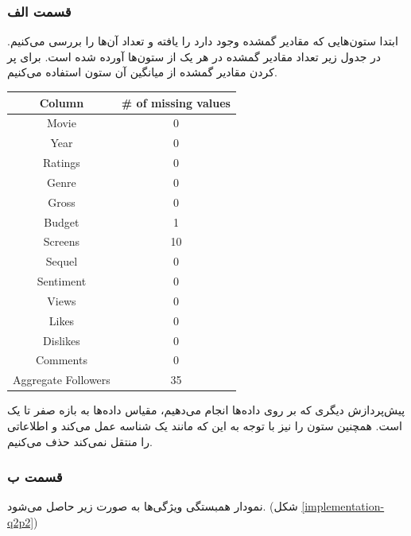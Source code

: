 \documentclass[14pt,a4]{article}
\begin{document}
\subsubsection*{قسمت الف}

ابتدا ستون‌هایی که مقادیر گمشده وجود دارد را یافته و تعداد آن‌ها را بررسی می‌کنیم.
در جدول زیر تعداد مقادیر گمشده در هر یک از ستون‌ها آورده شده است. برای پر کردن مقادیر گمشده از میانگین
آن‌ ستون استفاده می‌کنیم.

\begin{latin}
    \begin{table}
        \centering
        \begin{tabular}{c|c}
            Column               & \# of missing values \\
            \hline
            Movie                &  0 \\
            Year                 &  0 \\
            Ratings              &  0 \\
            Genre                &  0 \\
            Gross                &  0 \\
            Budget               &  1 \\
            Screens              & 10 \\
            Sequel               &  0 \\
            Sentiment            &  0 \\
            Views                &  0 \\
            Likes                &  0 \\
            Dislikes             &  0 \\
            Comments             &  0 \\
            Aggregate Followers  & 35
        \end{tabular}
    \end{table}
\end{latin}

پیش‌پردازش دیگری که بر روی داده‌ها انجام می‌دهیم، مقیاس داده‌ها به بازه صفر تا یک است. همچنین ستون 
را نیز با توجه به این که مانند یک شناسه عمل می‌کند و اطلاعاتی را منتقل نمی‌کند حذف می‌کنیم.

\subsubsection*{قسمت ب}

نمودار همبستگی ویژگی‌ها به صورت زیر حاصل می‌شود. (شکل \ref{implementation-q2p2})
\end{document}
